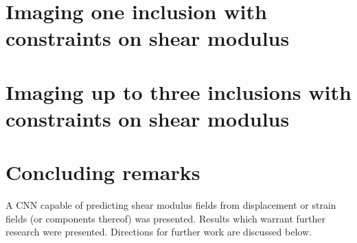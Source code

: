 \documentclass[12pt]{article}
\begin{document}
\section{\label{sect:oneinc2}Imaging one inclusion with constraints on shear modulus}
\section{\label{sect:threeinc2}Imaging up to three inclusions with constraints on shear modulus}
\section{Concluding remarks}
A CNN capable of predicting shear modulus fields from displacement or strain fields (or components thereof) was presented. Results which warrant further research were presented. Directions for further work are discussed below. 
\end{document}
